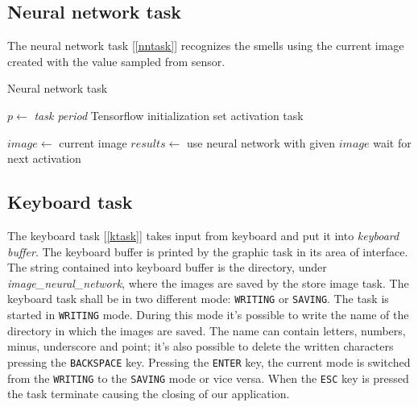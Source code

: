 \documentclass[12pt]{article}
\begin{document}
\subsection{Neural network task}
The neural network task [\ref{nntask}] recognizes the smells using the
current image created with the value sampled from sensor.

\begin{algorithm}[t]
\caption{Neural network task}
\label{nntask}

\begin{algorithmic}
\State $p\gets$ \textit{task period}
\State Tensorflow initialization
\State set activation task

\Loop
\State $image\gets$ current image
\State $results\gets$ use neural network with given $image$
\State wait for next activation
\EndLoop

\end{algorithmic}
\end{algorithm}

\subsection{Keyboard task}
The keyboard task [\ref{ktask}] takes input from keyboard and
put it into \textit{keyboard buffer}. The keyboard buffer is printed by the
graphic task in its area of interface. The string contained into keyboard
buffer is the directory, under \textit{image\_neural\_network}, where the
images are saved by the store image task. The keyboard task shall be in two
different mode: \texttt{WRITING} or \texttt{SAVING}. The task is started in
\texttt{WRITING} mode. During this mode it's possible to write the name of
the directory in which the images are saved. The name can contain letters,
numbers, minus, underscore and point; it's also possible to delete the written
characters pressing the \texttt{BACKSPACE} key. Pressing the
\texttt{ENTER} key, the current mode is switched from the \texttt{WRITING} to
the \texttt{SAVING} mode or vice versa. When the \texttt{ESC} key is pressed the
task terminate causing the closing of our application.
\end{document}
